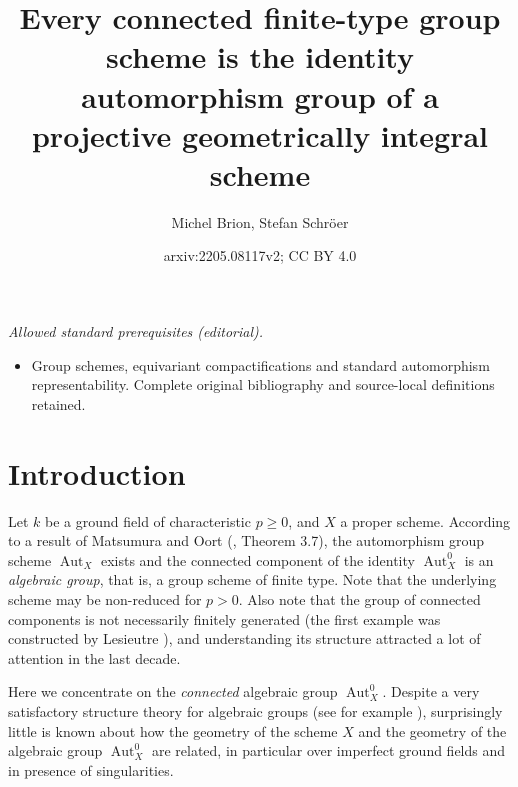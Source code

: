 \documentclass[oneside, 12pt]{amsart}
\title{Every connected finite-type group scheme is the identity automorphism group of a projective geometrically integral scheme}
\author{Michel Brion, Stefan Schröer}
\date{arxiv:2205.08117v2; CC BY 4.0}
\theoremstyle{definition}
\theoremstyle{remark}
\newcommand{\Aut}{\operatorname{Aut}}
\begin{document}
\maketitle
\noindent\textit{Allowed standard prerequisites (editorial).}\begin{itemize}
\item Group schemes, equivariant compactifications and standard automorphism representability. Complete original bibliography and source-local definitions retained.
\end{itemize}\medskip
\section*{Introduction}
\label{Introduction}

Let $k$ be a ground field of characteristic $p\geq 0$, and $X$ a proper scheme. 
According to a result of Matsumura and Oort  (\cite{Matsumura; Oort 1967}, 
Theorem 3.7),  the automorphism group scheme $\Aut_X$ exists and 
the connected component of the identity $\Aut^0_X$ is an \emph{algebraic group}, 
that is,  a group scheme of finite type.
Note that  the underlying scheme may be non-reduced for $p>0$.
Also note  that the group of connected components is not necessarily finitely generated 
(the first example was constructed by Lesieutre \cite{Lesieutre 2018}),
and understanding its structure attracted a lot of attention in the last decade.
 
Here we concentrate on the \emph{connected} algebraic group $\Aut_X^0$. 
Despite a very satisfactory structure theory for algebraic groups 
(see for example \cite{Milne 2017}),  surprisingly little is known about how the geometry 
of the scheme $X$ and the  geometry of the algebraic group $\Aut_X^0$ are related, 
in particular over imperfect ground fields and in presence of singularities.
\end{document}
